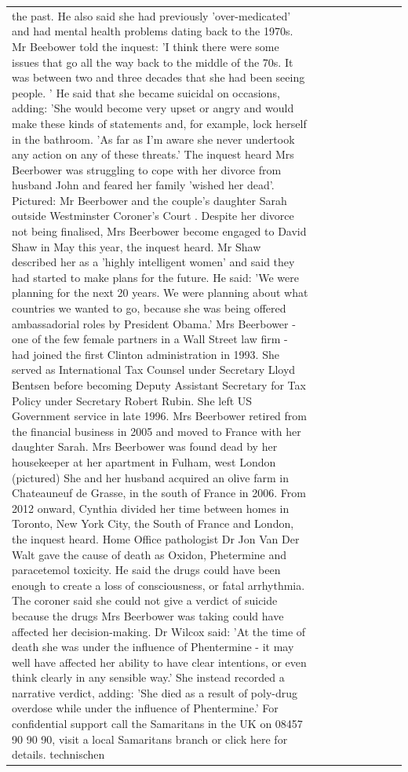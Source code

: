 \begin{table}[H]
\begin{tabular}{lllrlllll}
the past. He also said she had previously 'over-medicated' and had mental health problems dating back to the 1970s. Mr Beebower told the inquest: 'I think there were some issues that go all the way back to the middle of the 70s. It was between two and three decades that she had been seeing people. ' He said that she became suicidal on occasions, adding: 'She would become very upset or angry and would make these kinds of statements and, for example, lock herself in the bathroom. 'As far as I'm aware she never undertook any action on any of these threats.' The inquest heard Mrs Beerbower was struggling to cope with her divorce from husband John and feared her family 'wished her dead'. Pictured: Mr Beerbower and the couple's daughter Sarah outside Westminster Coroner's Court . Despite her divorce not being finalised, Mrs Beerbower become engaged to David Shaw in May this year, the inquest heard. Mr Shaw described her as a 'highly intelligent women' and said they had started to make plans for the future. He said: 'We were planning for the next 20 years. We were planning about what countries we wanted to go, because she was being offered ambassadorial roles by President Obama.' Mrs Beerbower - one of the few female partners in a Wall Street law firm - had joined the first Clinton administration in 1993. She served as International Tax Counsel under Secretary Lloyd Bentsen before becoming Deputy Assistant Secretary for Tax Policy under Secretary Robert Rubin. She left US Government service in late 1996. Mrs Beerbower retired from the financial business in 2005 and moved to France with her daughter Sarah. Mrs Beerbower was found dead by her housekeeper at her apartment in Fulham, west London (pictured) She and her husband acquired an olive farm in Chateauneuf de Grasse, in the south of France in 2006. From 2012 onward, Cynthia divided her time between homes in Toronto, New York City, the South of France and London, the inquest heard. Home Office pathologist Dr Jon Van Der Walt gave the cause of death as Oxidon, Phetermine and paracetemol toxicity. He said the drugs could have been enough to create a loss of consciousness, or fatal arrhythmia. The coroner said she could not give a verdict of suicide because the drugs Mrs Beerbower was taking could have affected her decision-making. Dr Wilcox said: 'At the time of death she was under the influence of Phentermine - it may well have affected her ability to have clear intentions, or even think clearly in any sensible way.' She instead recorded a narrative verdict, adding: 'She died as a result of poly-drug overdose while under the influence of Phentermine.' For confidential support call the Samaritans in the UK on 08457 90 90 90, visit a local Samaritans branch or click here for details. technischen \\

\end{tabular}
\end{table}
